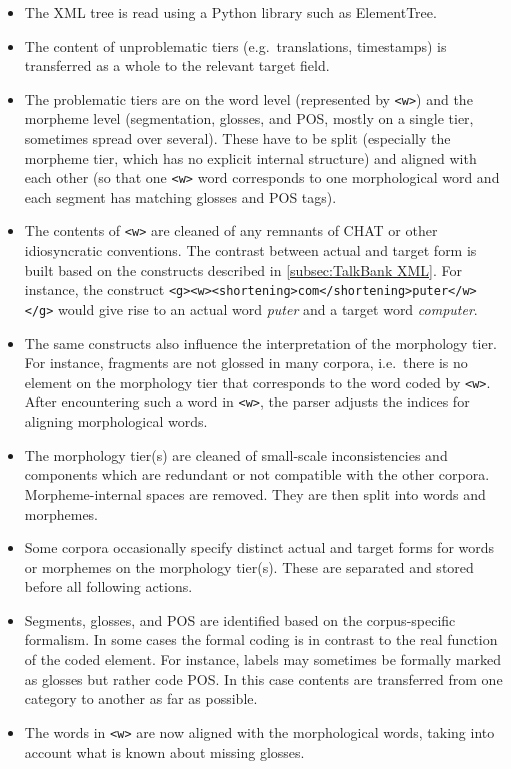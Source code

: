 \documentclass[a4paper, 11pt]{book}
\begin{document}
\begin{itemize}
	\item The XML tree is read using a Python library such as ElementTree. 
	\item The content of unproblematic tiers (e.g.\ translations, timestamps) is transferred as a whole to the relevant target field. 
	\item The problematic tiers are on the word level (represented by \texttt{<w>}) and the morpheme level (segmentation, glosses, and POS, mostly on a single tier, sometimes spread over several). 
		These have to be split (especially the morpheme tier, which has no explicit internal structure) and aligned with each other (so that one \texttt{<w>} word corresponds to one morphological word
		and each segment has matching glosses and POS tags). 
	\item The contents of \texttt{<w>} are cleaned of any remnants of CHAT or other idiosyncratic conventions. The contrast between actual and target form is built based on the constructs described 
		in \autoref{subsec:TalkBank XML}. For instance, the construct \texttt{<g><w><shortening>com</shortening>puter</w> </g>} would give rise to an actual word \emph{puter} and a target word \emph{computer}. 
	\item The same constructs also influence the interpretation of the morphology tier. For instance, fragments are not glossed in many corpora, i.e.\ there is no element on the 
		morphology tier that corresponds to the word coded by \texttt{<w>}. After encountering such a word in \texttt{<w>}, the parser adjusts the indices for aligning morphological words. 
	\item The morphology tier(s) are cleaned of small-scale inconsistencies and components which are redundant or not compatible with the other corpora. Morpheme-internal spaces are removed. 
		They are then split into words and morphemes. 
	\item Some corpora occasionally specify distinct actual and target forms for words or morphemes on the morphology tier(s). These are separated and stored before all following actions. 
	\item Segments, glosses, and POS are identified based on the corpus-specific formalism. In some cases the formal coding is in contrast to the real function of the coded element. For instance, 
		labels may sometimes be formally marked as glosses but rather code POS. In this case contents are transferred from one category to another as far as possible. 
	\item The words in \texttt{<w>} are now aligned with the morphological words, taking into account what is known about missing glosses. 
\end{itemize}
\end{document}
